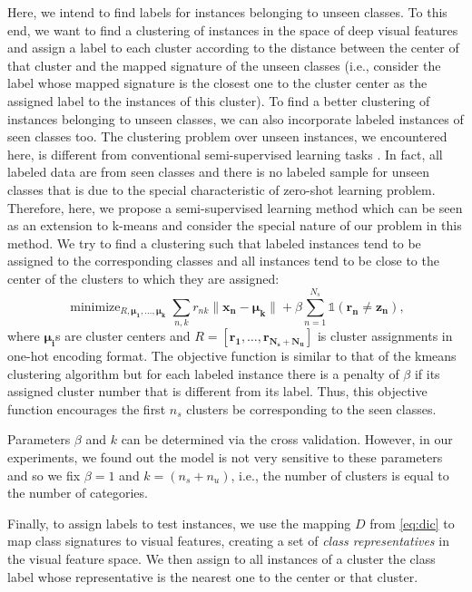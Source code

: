 \documentclass[10pt,twocolumn,letterpaper]{article}
\DeclareMathOperator*{\minimize}{minimize}
\begin{document}
Here, we intend to find labels for instances belonging to unseen classes. To this end, we want to find a clustering of instances in the space of deep visual features and assign a label to each cluster according to the distance between the center of that cluster and the mapped signature of the unseen classes (i.e., consider the label whose mapped signature is the closest one to the cluster center as the assigned label to the instances of this cluster). To find a better clustering of instances belonging to unseen classes, we can also incorporate labeled instances of seen classes too. The clustering problem over unseen instances, we encountered here, is different from conventional semi-supervised learning tasks \cite{}.
In fact, all labeled data are from seen classes and there is no labeled sample for unseen classes that is due to the special characteristic of zero-shot learning problem. Therefore, here, we propose a semi-supervised learning method which
can be seen as an extension to k-means and consider the special nature of our problem in this method.
 We try to find a clustering such that labeled instances tend to be assigned to the corresponding classes and all instances tend to be close to the center of the clusters to which they are assigned:
\begin{equation}
\minimize_{R, \mathbf{\mu_1, \ldots, \mu_k }}  \sum_{n,k} r_{nk} \lVert \mathbf{x_n - \mu_k} \rVert +
 \beta \sum_{n=1}^{N_s} \mathds{1}(\mathbf{r_n \neq z_n}),
\end{equation}
where $\mathbf{\mu_i}$s are cluster centers and $R = [\mathbf{r_1, \ldots, r_{N_s + N_u }} ]$ is cluster assignments in one-hot encoding format.
The objective function is similar to that of the kmeans clustering algorithm but for each labeled instance there is a penalty of $\beta$ if its assigned cluster number that is different from its label. Thus, this objective function encourages
the first $n_s$ clusters be corresponding to the seen classes.

Parameters $\beta$ and $k$ can be determined via the cross validation. However, in our experiments, we found out
the model is not very sensitive to these parameters and so we fix $\beta=1$ and $k =  (n_s + n_u)$, i.e., the number of clusters is equal to the number of categories.

Finally, to assign labels to test instances, we use the mapping $D$ from \eqref{eq:dic} to map class signatures to visual features, creating a set of \textit{class representatives} in the visual feature space. We then assign to all instances of a cluster the class label whose representative is the nearest one to the center or that cluster.
\end{document}
